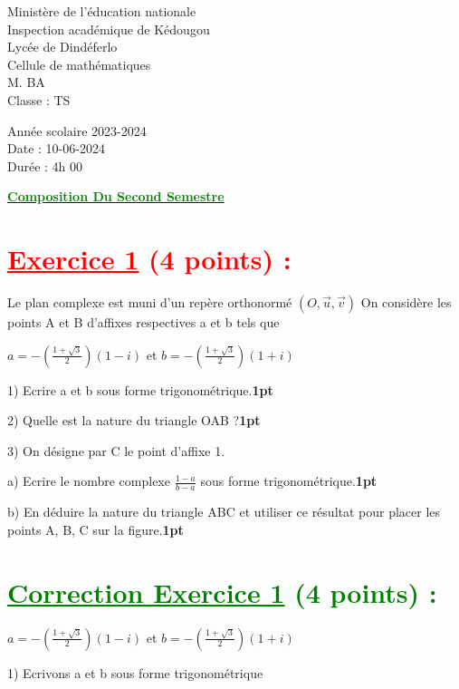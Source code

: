 \documentclass[12pt]{article}
\begin{document}
\begin{minipage}{0.5\textwidth}
	Ministère de l'éducation nationale  \\
	Inspection académique de Kédougou   \\
	Lycée de Dindéferlo            \\
	Cellule de mathématiques            \\
	M. BA                          \\
	Classe : TS  \\
\end{minipage}
\begin{minipage}{0.5\textwidth}
	Année scolaire 2023-2024 \\
	Date : 10-06-2024 \\
	Durée : 4h 00 \\
\end{minipage}

\begin{center}
	\textbf{{\underline{\textcolor{green}{Composition Du Second Semestre}}}}
\end{center}

\section*{\textcolor{red}{\underline{Exercice 1} (4 points) :}}
Le plan complexe est muni d’un repère orthonormé $(O,\vec{u},\vec{v})$
On considère les points A et B d’affixes respectives a et b tels que

$a=-(\frac{1+\sqrt{3}}{2})(1-i)$ et $b=-(\frac{1+\sqrt{3}}{2})(1+i)$ 

1) Ecrire a et b sous forme trigonométrique.\textbf{1pt}

2) Quelle est la nature du triangle OAB ?\textbf{1pt}

3) On désigne par C le point d’affixe 1.

a) Ecrire le nombre complexe $\frac{1-a}{b-a}$  sous forme trigonométrique.\textbf{1pt}

b) En déduire la nature du triangle ABC et  utiliser ce résultat pour placer les points A, B, C sur la figure.\textbf{1pt}
\section*{\textcolor{green}{\underline{Correction Exercice 1} (4 points) :}}
$a=-(\frac{1+\sqrt{3}}{2})(1-i)$ et $b=-(\frac{1+\sqrt{3}}{2})(1+i)$ 

1) Ecrivons a et b sous forme trigonométrique
\end{document}

